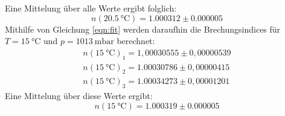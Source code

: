 Eine Mittelung über alle Werte ergibt folglich:
\begin{equation}
    n(\SI{20,5}{\celsius} ) = 1.000312 \pm 0.000005
\end{equation}
Mithilfe von Gleichung \eqref{eqn:fit} werden daraufhin die Brechungsindices für $T = \SI{15}{\celsius}$ und $p = \SI{1013}{\milli \bar}$
berechnet:
\begin{align}
    n(\SI{15}{\celsius} )_\text{1} = 1,00030555 \pm 0,00000539 \\
    n(\SI{15}{\celsius} )_\text{2} = 1.00030786 \pm 0,00000415 \\
    n(\SI{15}{\celsius} )_\text{3} = 1.00034273 \pm 0,00001201
\end{align}
Eine Mittelung über diese Werte ergibt:
\begin{equation}
    n(\SI{15}{\celsius} ) = 1.000319 \pm 0.000005
\end{equation}
